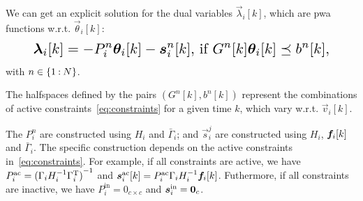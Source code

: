 \documentclass{ifacconf}  %
\begin{document}
We can get an explicit solution for the dual variables $\vec{\lambda}_{i}[k]$, which are \acrfull{pwa} functions w.r.t. $\vec{\theta}_{i}[k]$:
\begin{equation}
\resizebox{.88\columnwidth}{!}{$
  \begin{aligned}\label{eq:lambdafuntheta}
    \lambdaik=
      -P_{i}^{n}\thetaik-\vec{s}_{i}^{n}[k]\text{, if}\ G^{n}[k]\thetaik \preceq b^{n}[k],
  \end{aligned}
  $}
\end{equation}
with $n\in\{1\mathbin{:} N\}$.

The halfspaces defined by the pairs $(G^{n}[k],b^{n}[k])$ represent the combinations of active constraints~\eqref{eq:constraints} for a given time $k$, which vary w.r.t. $\vec{v}_{i}[k]$.

The $P_{i}^{n}$ are constructed using $H_{i}$ and $\bar{\Gamma}_{i}$; and $\vec{s}_{i}^{j}$ are constructed using $H_{i}$, $\fik$ and $\bar{\Gamma}_{i}$. The specific construction depends on the active constraints in~\eqref{eq:constraints}.
For example, if all constraints are active, we have ${P_{i}^{\text{ac}}={(\relax{\Gamma}_{i}H_{i}^{-1}\relax{\Gamma}_{i}^{\mathrm{T}})}^{-1}}$ and ${\vec{s}_{i}^{\text{ac}}[k]=P_{i}^{\text{ac}}\bar{\Gamma}_{i}H_{i}^{-1}\fik}$.
Futhermore, if all constraints are inactive, we have ${P_{i}^{\text{in}}=0_{c\times c}}$ and ${\boldsymbol{s}_{i}^{\text{in}}=\mathbf{0}_{c}}$.

\end{document}
